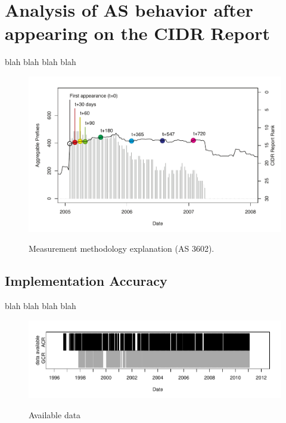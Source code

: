 \section{Analysis of AS behavior after appearing on the CIDR Report}

blah blah blah blah

\begin{figure}
\begin{centering}
    \includegraphics[width=6in]{figures/single_as.pdf}
    \vspace{-2em}\\
    \caption{Measurement methodology explanation (AS 3602).}
\end{centering}
\end{figure}


\subsection{Implementation Accuracy}

blah blah blah blah

\begin{figure}
\begin{centering}
    \includegraphics[width=6in]{figures/data_avail.pdf}
    \vspace{-2em}\\
    \caption{Available data}
\end{centering}
\end{figure}


